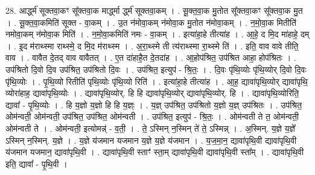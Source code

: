\documentclass[17pt]{extarticle}
\begin{document}
28. आर्द्ध्म॑ सूक्तवा॒कꣳ सू᳚क्तवा॒क मार्द्ध्मा र्द्ध्म॑ सूक्तवा॒कम् । . सू॒क्त॒वा॒क मु॒तोत सू᳚क्तवा॒कꣳ सू᳚क्तवा॒क मु॒त । . सू॒क्त॒वा॒कमिति॑ सूक्त - वा॒कम् । . उ॒त न॑मोवा॒कम् न॑मोवा॒क मु॒तोत न॑मोवा॒कम् । . न॒मो॒वा॒क मितीति॑ नमोवा॒कम् न॑मोवा॒क मिति॑ । . न॒मो॒वा॒कमिति॑ नमः - वा॒कम् । . इत्या॑हा॒हे तीत्या॑ह । . आ॒हे॒ द मि॒द मा॑हाहे॒ दम् । . इ॒द म॑राथ्स्मा राथ्स्मे॒ द मि॒द म॑राथ्स्म । . अ॒रा॒थ्स्मे ती त्य॑राथ्स्मा रा॒थ्स्मे ति॑ । . इति॒ वाव वावे तीति॒ वाव । . वावैत दे॒तद् वाव वावैतत् । . ए॒त दा॑हाहै॒त दे॒तदा॑ह । . आ॒होप॑श्रित॒ उप॑श्रित आहा॒ होप॑श्रितः । . उप॑श्रितो दि॒वो दि॒व उप॑श्रित॒ उप॑श्रितो दि॒वः । . उप॑श्रित॒ इत्युप॑ - श्रि॒तः॒ । . दि॒वः पृ॑थि॒व्योः पृ॑थि॒व्योर् दि॒वो दि॒वः पृ॑थि॒व्योः । . पृ॒थि॒व्यो रितीति॑ पृथि॒व्योः पृ॑थि॒व्यो रिति॑ । . इत्या॑हा॒हे तीत्या॑ह । . आ॒ह॒ द्यावा॑पृथि॒व्योर् द्यावा॑पृथि॒ व्योरा॑हाह॒ द्यावा॑पृथि॒व्योः । . द्यावा॑पृथि॒व्योर्. हि हि द्यावा॑पृथि॒व्योर् द्यावा॑पृथि॒व्योर्. हि । . द्यावा॑पृथि॒व्योरिति॒ द्यावा᳚ - पृ॒थि॒व्योः । . हि य॒ज्ञो य॒ज्ञो हि हि य॒ज्ञ्ः । . य॒ज्ञ् उप॑श्रित॒ उप॑श्रितो य॒ज्ञो य॒ज्ञ् उप॑श्रितः । . उप॑श्रित॒ ओम॑न्वती॒ ओम॑न्वती॒ उप॑श्रित॒ उप॑श्रित॒ ओम॑न्वती । . उप॑श्रित॒ इत्युप॑ - श्रि॒तः॒ । . ओम॑न्वती ते त॒ ओम॑न्वती॒ ओम॑न्वती ते । . ओम॑न्वती॒ इत्योमन्न्॑ - व॒ती॒ । . ते॒ ऽस्मिन् न॒स्मिन् ते॑ ते॒ ऽस्मिन्न् । . अ॒स्मिन्. य॒ज्ञे य॒ज्ञे᳚ ऽस्मिन् न॒स्मिन्. य॒ज्ञे । . य॒ज्ञे य॑जमान यजमान य॒ज्ञे य॒ज्ञे य॑जमान । . य॒ज॒मा॒न॒ द्यावा॑पृथि॒वी द्यावा॑पृथि॒वी य॑जमान यजमान॒ द्यावा॑पृथि॒वी । . द्यावा॑पृथि॒वी स्ताꣳ॑ स्ता॒म् द्यावा॑पृथि॒वी द्यावा॑पृथि॒वी स्ता᳚म् । . द्यावा॑पृथि॒वी इति॒ द्यावा᳚ - पृ॒थि॒वी । \newline
\end{document}
